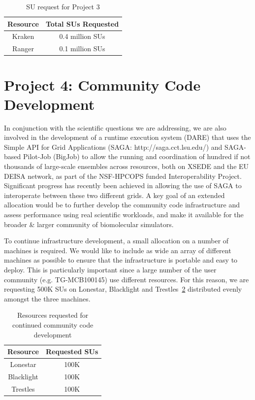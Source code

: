 \documentclass[a4paper,10pt]{article}
\newcommand{\up}{\vspace*{-1em}}
\begin{document}
\begin{table}[!h]
\begin{center}
\begin{tabular}{|c|c| }
\hline 
Resource & Total SUs Requested \\ 
\hline
Kraken   & 0.4 million SUs \\
\hline
Ranger   & 0.1 million SUs \\
\hline
\end{tabular}
\end{center}
  \caption{SU request for Project 3}\label{table:project3}
\up
\end{table}



\section{Project 4: Community Code Development}
In conjunction with the scientific questions we are addressing, we are also involved in the development of a runtime execution system (DARE) that uses the Simple API for Grid Applications (SAGA: http://saga.cct.lsu.edu/) and SAGA-based Pilot-Job (BigJob) to allow the running and coordination of hundred if not thousands of large-scale ensembles across resources, both on XSEDE and the EU DEISA network, as part of the NSF-HPCOPS funded Interoperability Project. Significant progress has recently been achieved in allowing the use of SAGA to interoperate between these two different grids.  A key goal of an extended allocation would be to further develop the community code infrastructure and assess performance using real scientific workloads, and make it available for the broader \& larger community of biomolecular simulators.

To continue infrastructure development, a small allocation on a number of machines is required. We would like to include as wide an array of different machines as possible to ensure that the infrastructure is portable and easy to deploy. This is particularly important since a large number of the user community (e.g. TG-MCB100145) use different resources. For this reason, we are requesting 500K SUs on Lonestar, Blacklight and Trestles~\ref{table:Infrastructure} distributed evenly amongst the three machines.

\begin{table}[!h]
\up
\begin{center}
\begin{tabular}{|c| c | }
\hline 
Resource & Requested SUs\\ 
\hline
Lonestar  &  100K \\
\hline
Blacklight &  100K \\
\hline
Trestles  &  100K \\
\hline
\end{tabular}
\end{center}
  \caption{\small Resources requested for continued community code development}\label{table:Infrastructure}
\up
\end{table}
\end{document}
